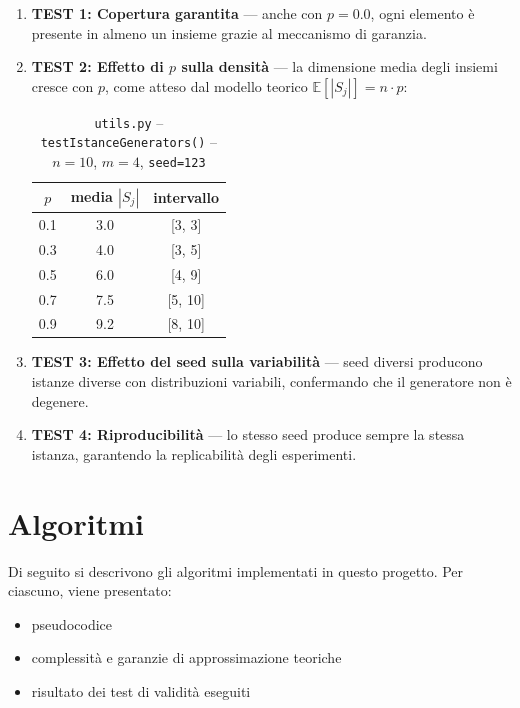 \documentclass[12pt, a4paper]{article}
\begin{document}
\begin{enumerate}
    \item \textbf{TEST 1: Copertura garantita} — anche con $p = 0.0$, ogni elemento 
    è presente in almeno un insieme grazie al meccanismo di garanzia.

    \item \textbf{TEST 2: Effetto di $p$ sulla densità} — la dimensione media degli 
    insiemi cresce con $p$, come atteso dal modello teorico 
    $\mathbb{E}[|S_j|] = n \cdot p$:

    \begin{table}[H]
    \centering
    \caption{\texttt{utils.py} -- \texttt{testIstanceGenerators()} -- $n=10$, $m=4$, \texttt{seed=123}}
    \begin{tabular}{ccc}
    \toprule
    $p$ & media $|S_j|$ & intervallo \\
    \midrule
    0.1 & 3.0 & [3, 3] \\
    0.3 & 4.0 & [3, 5] \\
    0.5 & 6.0 & [4, 9] \\
    0.7 & 7.5 & [5, 10] \\
    0.9 & 9.2 & [8, 10] \\
    \bottomrule
    \end{tabular}
    \end{table}

    \item \textbf{TEST 3: Effetto del seed sulla variabilità} — seed diversi 
    producono istanze diverse con distribuzioni variabili, 
    confermando che il generatore non è degenere.

    \item \textbf{TEST 4: Riproducibilità} — lo stesso seed produce sempre 
    la stessa istanza, garantendo la replicabilità degli esperimenti.
\end{enumerate}

\section{Algoritmi}
\label{sec:algoritmi}

Di seguito si descrivono gli algoritmi implementati in questo progetto.
Per ciascuno, viene presentato:
\begin{itemize}
\item pseudocodice
\item complessità e garanzie di approssimazione teoriche
\item risultato dei test di validità eseguiti
\end{itemize}
\end{document}
